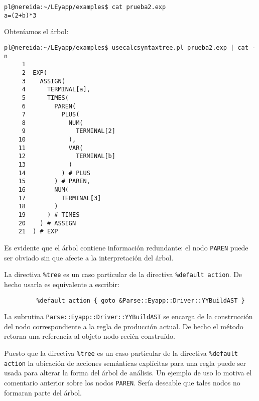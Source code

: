 \begin{verbatim}
pl@nereida:~/LEyapp/examples$ cat prueba2.exp
a=(2+b)*3
\end{verbatim}
Obteníamos el árbol:
\begin{verbatim}
pl@nereida:~/LEyapp/examples$ usecalcsyntaxtree.pl prueba2.exp | cat -n
     1
     2  EXP(
     3    ASSIGN(
     4      TERMINAL[a],
     5      TIMES(
     6        PAREN(
     7          PLUS(
     8            NUM(
     9              TERMINAL[2]
    10            ),
    11            VAR(
    12              TERMINAL[b]
    13            )
    14          ) # PLUS
    15        ) # PAREN,
    16        NUM(
    17          TERMINAL[3]
    18        )
    19      ) # TIMES
    20    ) # ASSIGN
    21  ) # EXP
\end{verbatim}
Es evidente que el árbol contiene información redundante: el nodo \verb|PAREN| 
puede ser obviado sin que afecte a la interpretación del árbol.

La directiva \verb|%tree| es un caso particular de la directiva \verb|%default action|.
De hecho usarla es equivalente a escribir:

\begin{verbatim}
         %default action { goto &Parse::Eyapp::Driver::YYBuildAST }
\end{verbatim}

La subrutina \verb|Parse::Eyapp::Driver::YYBuildAST| se encarga de la construcción
del nodo correspondiente a la regla de producción actual. De hecho el método
retorna una referencia al objeto nodo recién construído.

Puesto que la directiva \verb|%tree| es un caso particular de la directiva \verb|%default action|
la ubicación de acciones semánticas explícitas para una regla puede ser usada 
para alterar la forma del árbol de análisis.
Un ejemplo de uso  lo motiva el comentario anterior sobre los nodos \verb|PAREN|. 
Sería deseable que tales nodos no formaran parte del árbol.


